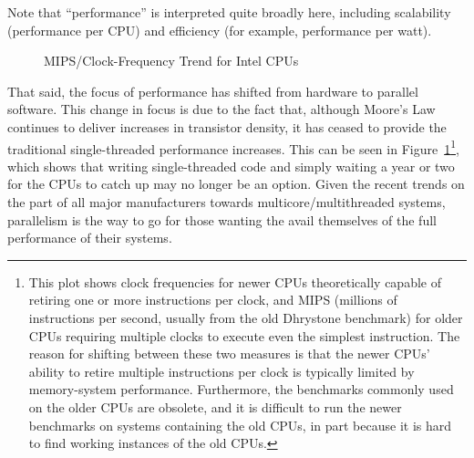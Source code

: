Note that ``performance'' is interpreted quite broadly here,
including scalability (performance per CPU) and efficiency
(for example, performance per watt).

\begin{figure}[tb]
\centering
{}
\caption{MIPS/Clock-Frequency Trend for Intel CPUs}
\label{fig:intro:Clock-Frequency Trend for Intel CPUs}
\end{figure}

That said, the focus of performance has shifted from hardware to
parallel software.
This change in focus is due to the fact that, although Moore's Law
continues to deliver increases in transistor density, it has ceased to
provide the traditional single-threaded performance increases.
This can be seen in
Figure~\ref{fig:intro:Clock-Frequency Trend for Intel CPUs}\footnote{
	This plot shows clock frequencies for newer CPUs theoretically
	capable of retiring one or more instructions per clock, and MIPS
	(millions of instructions per second, usually from the old
	Dhrystone benchmark)
	for older CPUs requiring multiple clocks to execute even the
	simplest instruction.
	The reason for shifting between these two measures is that the
	newer CPUs' ability to retire multiple instructions per clock is
	typically limited by memory-system performance.
	Furthermore, the benchmarks commonly used on the older CPUs
	are obsolete, and it is difficult to run the newer benchmarks
	on systems containing the old CPUs, in part because it is hard
	to find working instances of the old CPUs.},
which shows that writing single-threaded code and simply waiting
a year or two for the CPUs to catch up may no longer be an option.
Given the recent trends on the part of all major manufacturers towards
multicore/multithreaded systems, parallelism is the way to go for
those wanting the avail themselves of the full performance of their
systems.

